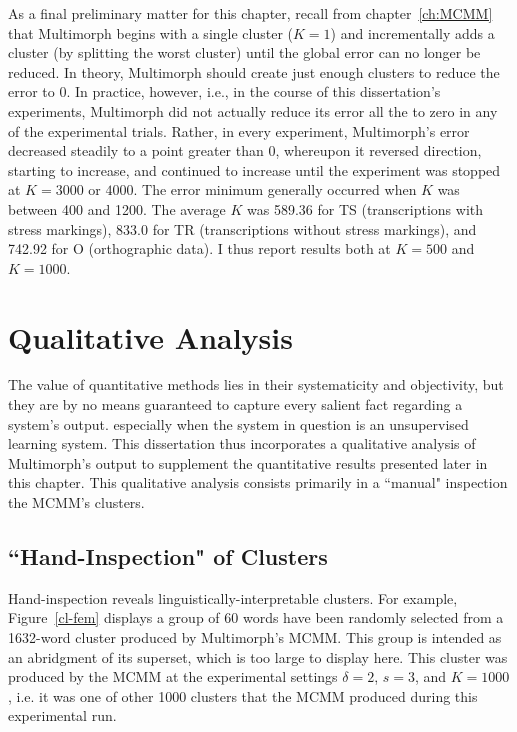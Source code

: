 As a final preliminary matter for this chapter, recall from chapter~\ref{ch:MCMM}  that Multimorph begins with a single cluster ($K = 1$) 
and incrementally adds a cluster (by splitting the worst cluster) until the global error can no longer be reduced.  
In theory, Multimorph should create just enough clusters to reduce the error
to 0. In practice, however, i.e., in the course of this dissertation's experiments,
 Multimorph did not actually reduce its error all the to zero in any of the experimental trials. 
 Rather, in every experiment, Multimorph's error decreased steadily to a point greater than 0, 
 whereupon it reversed direction, starting to 
increase, and continued to increase until the experiment was stopped at $K = 3000$ or $4000$.  
The error minimum generally occurred when $K$ was between 400 and 1200. 
The average $K$ was 589.36 for TS (transcriptions with stress markings), 833.0 for 
TR (transcriptions without stress markings), and 742.92 for O (orthographic data). I thus 
report results both at $K = 500$ and $K = 1000$.

\section{Qualitative Analysis}
\label{sec:qual}
The value of quantitative methods lies in their systematicity and objectivity, but
they are by no means guaranteed to capture every salient fact regarding a system's output. 
especially when the system in question is an unsupervised learning system. 
 This dissertation thus incorporates a qualitative analysis of Multimorph's output to supplement the  
quantitative results presented later in this chapter.
This qualitative analysis consists primarily in a ``manual" inspection the MCMM's clusters.

\subsection{``Hand-Inspection" of Clusters}
Hand-inspection reveals linguistically-interpretable clusters. For example, Figure~\ref{cl-fem} displays a group 
of 60 words have been randomly selected from a 1632-word cluster produced by Multimorph’s MCMM. This group 
is intended as an abridgment of its superset, which is too large to display here. This cluster was produced by the 
MCMM at the experimental settings $\delta = 2$, $s = 3$, and $K = 1000$, i.e. it was one of other 1000 clusters 
that the MCMM produced during this experimental run.

